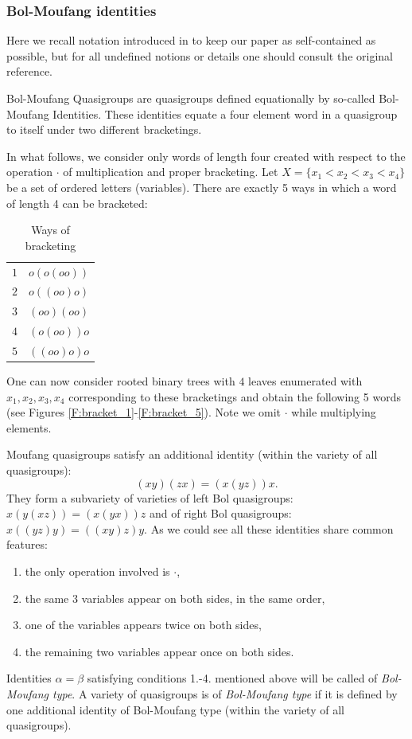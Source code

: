 \documentclass[11pt]{amsart}
\theoremstyle{definition}
\begin{document}
\subsubsection{Bol-Moufang identities}\label{Ss:BMid} %
Here we recall notation introduced in \cite{PhVo1} to keep our paper as self-contained as possible, but for all undefined notions or details one should consult the original reference.

Bol-Moufang Quasigroups are quasigroups defined equationally by so-called Bol-Moufang Identities. These identities equate a four element word in a quasigroup to itself under two different bracketings.

In what follows, we consider only words of length four created with respect to the operation $\cdot$ of multiplication and proper bracketing. Let $X=\{x_1<x_2<x_3<x_4\}$ be a set of ordered letters (variables). There are exactly 5 ways in which a word of length 4 can be bracketed:
\begin{table}    
\begin{center}
\begin{tabular}{c|c}
$1$ & $o(o(oo))$\\
$2$ & $o((oo)o)$\\
$3$ & $(oo)(oo)$\\
$4$ & $(o(oo))o$\\
$5$ & $((oo)o)o$
\end{tabular}
\end{center}
\caption{Ways of bracketing}\label{T:br}
\end{table}
One can now consider rooted binary trees with $4$ leaves enumerated with $x_1,x_2,x_3,x_4$ corresponding to these bracketings and obtain the following 5 words (see Figures \ref{F:bracket_1}-\ref{F:bracket_5}). Note we omit $\cdot$ while multiplying elements.

Moufang quasigroups satisfy an additional identity (within the variety of all quasigroups): 
\begin{equation*}
(xy)(zx)=(x(yz))x.
\end{equation*}
They form a subvariety of varieties of left Bol quasigroups: $x(y(xz))=(x(yx))z$ and of right Bol quasigroups: $x((yz)y)=((xy)z)y$. As we could see all these identities share common features:
\begin{enumerate}
\item the only operation involved is $\cdot$,
\item the same 3 variables appear on both sides, in the same order,
\item one of the variables appears twice on both sides,
\item the remaining two variables appear once on both sides.
\end{enumerate}
Identities $\alpha=\beta$ satisfying conditions 1.-4. mentioned above will be called of \emph{Bol-Moufang type}. A variety of quasigroups is of \emph{Bol-Moufang type} if it is defined by one additional identity of Bol-Moufang type (within the variety of all quasigroups).
\end{document}
